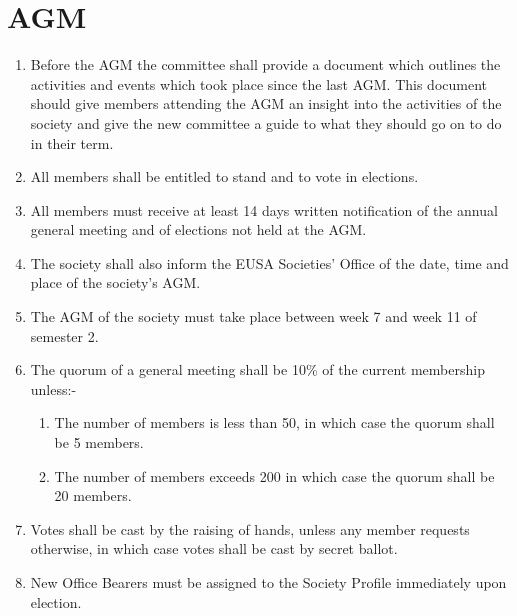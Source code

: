 \documentclass{article}
\begin{document}





\newpage{}
\section{AGM}

\begin{enumerate}

  \item Before the AGM the committee shall provide a document which outlines
    the activities and events which took place since the last AGM. This document
    should give members attending the AGM an insight into the activities
    of the society and give the new committee a guide to what they
    should go on to do in their term.

  \item All members shall be entitled to stand and to vote in elections.

  \item All members must receive at least 14 days written notification of the annual
    general meeting and of elections not held at the AGM.

  \item The society shall also inform the EUSA Societies’ Office of the date, time and
    place of the society’s AGM.

  \item The AGM of the society must take place between week 7 and week 11 of
    semester 2.

  \item The quorum of a general meeting shall be 10\% of the current membership
    unless:-
    \begin{enumerate}
      \item The number of members is less than 50, in which case the quorum
        shall be 5 members.
      \item The number of members exceeds 200 in which case the quorum shall
        be 20 members.
    \end{enumerate}

  \item Votes shall be cast by the raising of hands, unless any member requests
    otherwise, in which case votes shall be cast by secret ballot.

  \item New Office Bearers must be assigned to the Society Profile immediately
    upon election.


\end{enumerate}
\end{document}
